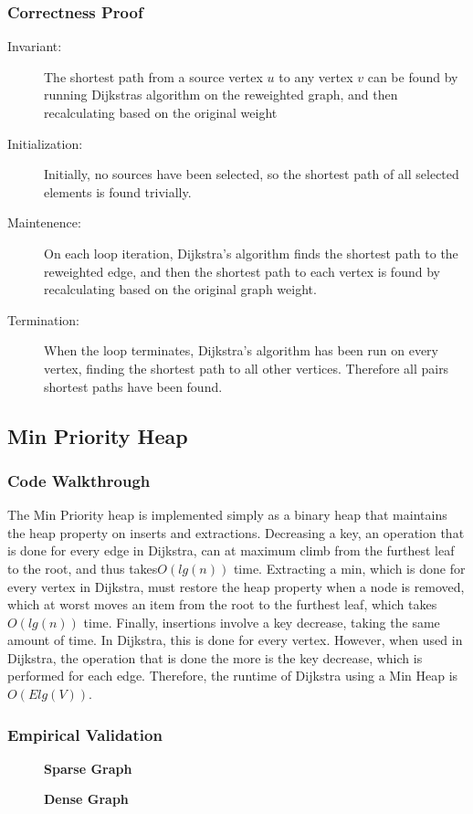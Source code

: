 \documentclass[a4paper,12pt]{article}
\begin{document}
\subsubsection{Correctness Proof}
\begin{description}
\item [Invariant: ] The shortest path from a source vertex $u$ to any vertex $v$ can be found by running Dijkstras algorithm on the reweighted graph, and then recalculating based on the original weight
\item [Initialization: ] Initially, no sources have been selected, so the shortest path of all selected elements is found trivially.
\item [Maintenence: ] On each loop iteration, Dijkstra's algorithm finds the shortest path to the reweighted edge, and then the shortest path to each vertex is found by recalculating based on the original graph weight.
\item [Termination: ] When the loop terminates, Dijkstra's algorithm has been run on every vertex, finding the shortest path to all other vertices. Therefore all pairs shortest paths have been found.
\end{description}
\subsection{Min Priority Heap}
\subsubsection{Code Walkthrough}
The Min Priority heap is implemented simply as a binary heap that maintains the heap
property on inserts and extractions. Decreasing a key, an operation that is done for every edge in Dijkstra, can at maximum climb from the furthest leaf to the root, and thus takes$O(lg(n))$ time. Extracting a min, which is done for every vertex in Dijkstra, must restore the heap property when a node is removed, which at worst moves an item from the root to the furthest leaf, which takes $O(lg(n))$ time. Finally, insertions involve a key decrease, taking the same amount of time. In Dijkstra, this is done for every vertex. However, when used in Dijkstra, the operation that is done the more is the key decrease, which is performed for each edge. Therefore, the runtime of Dijkstra using a Min Heap is $O(Elg(V))$.
\subsubsection{Empirical Validation}
\begin{figure}[H]
  \centering
  \textbf{Sparse Graph}\par\medskip
\end{figure}
\begin{figure}[H]
  \centering
  \textbf{Dense Graph}\par\medskip
\end{figure}
\end{document}
